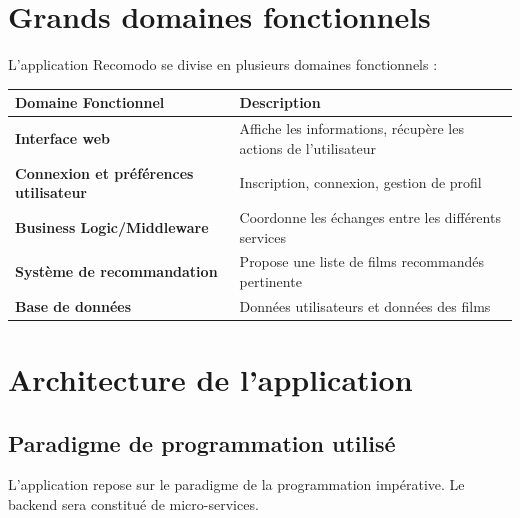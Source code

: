 \documentclass[a4paper,12pt]{report}
\begin{document}
\section{Grands domaines fonctionnels}
\label{df}
L'application Recomodo se divise en plusieurs domaines fonctionnels :
\begin{table}[h]
        \centering
        \begin{tabular}{@{}ll@{}}
            \toprule
            \textbf{Domaine Fonctionnel} & \textbf{Description}\\
            \midrule
            \textbf{Interface web} & Affiche les informations, récupère les actions de l'utilisateur\\
            \textbf{Connexion et préférences utilisateur} & Inscription, connexion, gestion de profil\\
            \textbf{Business Logic/Middleware} & Coordonne les échanges entre les différents services\\
            \textbf{Système de recommandation} & Propose une liste de films recommandés pertinente\\            \textbf{Base de données} & Données utilisateurs et données des films\\
            \bottomrule
        \end{tabular}
\end{table}
\newpage

\section{Architecture de l'application}
\label{archi}
\subsection{Paradigme de programmation utilisé}
L'application repose sur le paradigme de la programmation impérative. Le backend sera constitué de micro-services.
\end{document}
